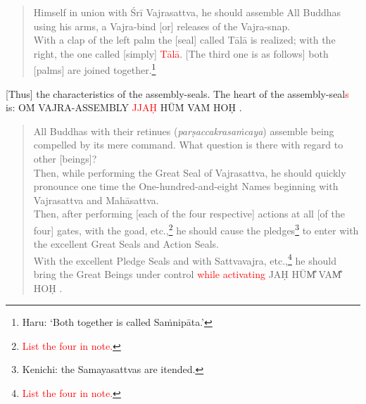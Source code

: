 \documentclass[11pt]{book}
\makeatletter
\def\fakesc#1{%
  \begingroup%
  \xdef\fake@name{\csname\curr@fontshape/\f@size\endcsname}%
  \fontsize{1.3\fontdimen8\fake@name}{\baselineskip}\selectfont%
  \uppercase{#1}%
  \endgroup%
}
\newcommand{\mantra}[1]{\fakesc{#1}}
\newcommand{\red}[1]{\textcolor{red}{#1}}
\newcommand{\skt}[1]{\emph{#1}}
\makeatother
\begin{document}

\begin{verse}
Himself in union with Śrī Vajrasattva, he should assemble All Buddhas using his arms, a Vajra-bind [or] releases of the Vajra-snap.\\
With a clap of the left palm the [seal] called Tālā is realized; with the right, the one called [simply] \red{Tālā}. [The third one is as follows] both [palms] are joined together.\footnote{Haru: `Both together is called Saṁnipāta.'}
\end{verse}

[Thus] the characteristics of the assembly-seals. The heart of the assembly-seal\red{s} is: \mantra{oṁ Vajra-Assembly \red{jjaḥ} hūṁ vaṁ hoḥ}.

\begin{verse}
All Buddhas with their retinues (\skt{parṣaccakrasaṁcaya}) assemble being compelled by its mere command. What question is there with regard to other [beings]?\\
Then, while performing the Great Seal of Vajrasattva, he should quickly pronounce one time the One-hundred-and-eight Names beginning with Vajrasattva and Mahāsattva.\\
Then, after performing [each of the four respective] actions at all [of the four] gates, with the goad, etc.,\footnote{\red{List the four in note.}} he should cause the pledges\footnote{Kenichi: the Samayasattvas are itended.} to enter with the excellent Great Seals and Action Seals.\\
With the excellent Pledge Seals and with Sattvavajra, etc.,\footnote{\red{List the four in note.}} he should bring the Great Beings under control \red{while activating} \mantra{jaḥ hūm̐ vam̐ hoḥ}.
\end{verse}
\end{document}
